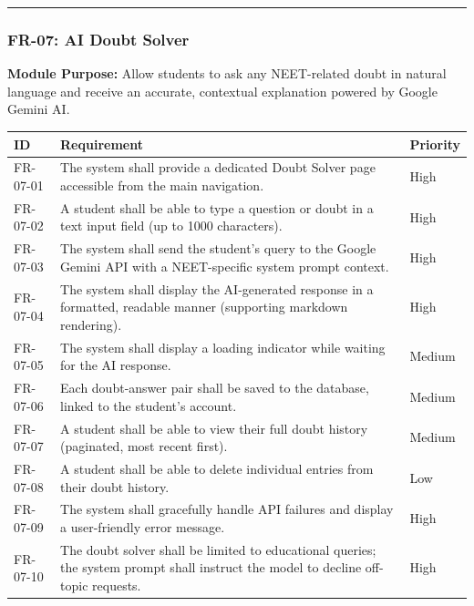 \documentclass[
]{article}
\begin{document}
\begin{center}\rule{0.5\linewidth}{0.5pt}\end{center}

\subsubsection{FR-07: AI Doubt Solver}\label{fr-07-ai-doubt-solver}

\textbf{Module Purpose:} Allow students to ask any NEET-related doubt in
natural language and receive an accurate, contextual explanation powered
by Google Gemini AI.

\begin{longtable}[]{@{}
  >{\raggedright\arraybackslash}p{}
  >{\raggedright\arraybackslash}p{}
  >{\raggedright\arraybackslash}p{}@{}}
\toprule\noalign{}
\begin{minipage}[b]{\linewidth}\raggedright
ID
\end{minipage} & \begin{minipage}[b]{\linewidth}\raggedright
Requirement
\end{minipage} & \begin{minipage}[b]{\linewidth}\raggedright
Priority
\end{minipage} \\
\midrule\noalign{}
\endhead
\bottomrule\noalign{}
\endlastfoot
FR-07-01 & The system shall provide a dedicated Doubt Solver page
accessible from the main navigation. & High \\
FR-07-02 & A student shall be able to type a question or doubt in a text
input field (up to 1000 characters). & High \\
FR-07-03 & The system shall send the student's query to the Google
Gemini API with a NEET-specific system prompt context. & High \\
FR-07-04 & The system shall display the AI-generated response in a
formatted, readable manner (supporting markdown rendering). & High \\
FR-07-05 & The system shall display a loading indicator while waiting
for the AI response. & Medium \\
FR-07-06 & Each doubt-answer pair shall be saved to the database, linked
to the student's account. & Medium \\
FR-07-07 & A student shall be able to view their full doubt history
(paginated, most recent first). & Medium \\
FR-07-08 & A student shall be able to delete individual entries from
their doubt history. & Low \\
FR-07-09 & The system shall gracefully handle API failures and display a
user-friendly error message. & High \\
FR-07-10 & The doubt solver shall be limited to educational queries; the
system prompt shall instruct the model to decline off-topic requests. &
High \\
\end{longtable}
\end{document}
